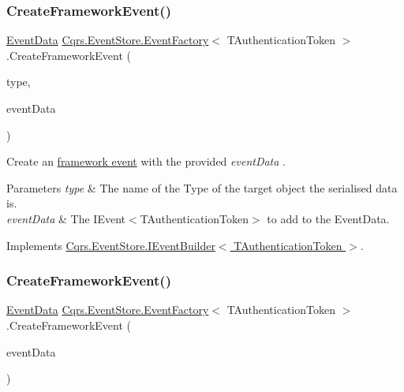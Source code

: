 \subsubsection{\texorpdfstring{Create\+Framework\+Event()}{CreateFrameworkEvent()}\hspace{0.1cm}{\footnotesize\ttfamily [1/4]}}
{\footnotesize\ttfamily \hyperlink{classCqrs_1_1Events_1_1EventData}{Event\+Data} \hyperlink{classCqrs_1_1EventStore_1_1EventFactory}{Cqrs.\+Event\+Store.\+Event\+Factory}$<$ T\+Authentication\+Token $>$.Create\+Framework\+Event (\begin{DoxyParamCaption}\item[{string}]{type,  }\item[{\hyperlink{interfaceCqrs_1_1Events_1_1IEvent}{I\+Event}$<$ T\+Authentication\+Token $>$}]{event\+Data }\end{DoxyParamCaption})}



Create an \hyperlink{}{framework event} with the provided {\itshape event\+Data} . 


\begin{DoxyParams}{Parameters}
{\em type} & The name of the Type of the target object the serialised data is.\\
\hline
{\em event\+Data} & The I\+Event$<$\+T\+Authentication\+Token$>$ to add to the Event\+Data.\\
\hline
\end{DoxyParams}


Implements \hyperlink{interfaceCqrs_1_1EventStore_1_1IEventBuilder_ab9608f44e12ce029fc98ad0eee53516a_ab9608f44e12ce029fc98ad0eee53516a}{Cqrs.\+Event\+Store.\+I\+Event\+Builder$<$ T\+Authentication\+Token $>$}.

\mbox{\label{classCqrs_1_1EventStore_1_1EventFactory_ae514998a8368283f882014cc0db5b2b2_ae514998a8368283f882014cc0db5b2b2}} 
\subsubsection{\texorpdfstring{Create\+Framework\+Event()}{CreateFrameworkEvent()}\hspace{0.1cm}{\footnotesize\ttfamily [2/4]}}
{\footnotesize\ttfamily \hyperlink{classCqrs_1_1Events_1_1EventData}{Event\+Data} \hyperlink{classCqrs_1_1EventStore_1_1EventFactory}{Cqrs.\+Event\+Store.\+Event\+Factory}$<$ T\+Authentication\+Token $>$.Create\+Framework\+Event (\begin{DoxyParamCaption}\item[{\hyperlink{interfaceCqrs_1_1Events_1_1IEvent}{I\+Event}$<$ T\+Authentication\+Token $>$}]{event\+Data }\end{DoxyParamCaption})}



